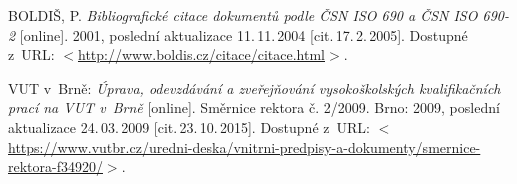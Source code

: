 \begin{literatura}{99}
	
    BOLDIŠ, P.
    \emph{Bibliografické citace dokumentů podle ČSN ISO 690 a ČSN ISO 690-2}\/ [online].
    2001, poslední aktualizace 11.\,11.\,2004 [cit.\,17.\,2.\,2005].
    Dostupné z~URL:
    \(<\)\url{http://www.boldis.cz/citace/citace.html}\(>\).

    VUT v~Brně:
    \emph{Úprava, odevzdávání a zveřejňování vysokoškolských kvalifikačních prací na VUT v~Brně}\/ [online]. Směrnice rektora č. 2/2009. Brno: 2009, poslední aktualizace 24.\,03.\,2009 [cit.\,23.\,10.\,2015].
    Dostupné z~URL:
    \(<\)\url{https://www.vutbr.cz/uredni-deska/vnitrni-predpisy-a-dokumenty/smernice-rektora-f34920/}\(>\).
	
\end{literatura}
